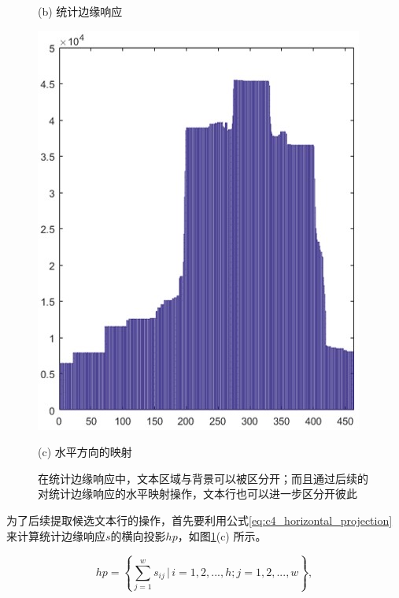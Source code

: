 \begin{figure}[!h]
\begin{minipage}[t]{0.35\linewidth}
        \centerline{\small (b) 统计边缘响应}
        \end{minipage}
        \begin{minipage}[t]{0.25\linewidth}
        \centering
        \includegraphics[width=\textwidth]{./figures/c4_horizontal_projection.jpg}
        \centerline{\small (c) 水平方向的映射}
        \end{minipage}
        \caption{在统计边缘响应中，文本区域与背景可以被区分开；而且通过后续的对统计边缘响应的水平映射操作，文本行也可以进一步区分开彼此}
        \label{fig.c4_static_skeleton_response}
        \end{figure}

        为了后续提取候选文本行的操作，首先要利用公式\ref{eq:c4_horizontal_projection} 来计算统计边缘响应$s$的横向投影$hp$，如图\ref{fig.c4_static_skeleton_response}(c) 所示。

        \begin{equation}
        hp= \left\{ \sum_{j=1}^w s_{ij} \, | \, i=1,2,...,h;j=1,2,...,w \right\},
        \label{eq:c4_horizontal_projection}
        \end{equation}


